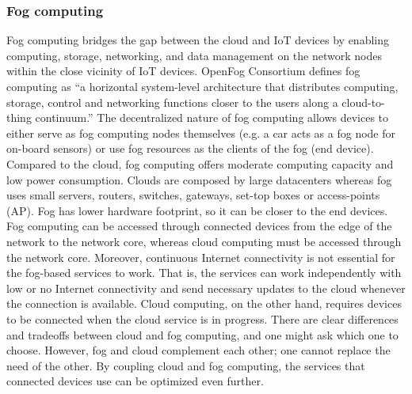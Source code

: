 \subsubsection{Fog computing}
Fog computing bridges the gap between the cloud and IoT devices by enabling computing, storage, networking, and data management on the network nodes within the close vicinity of IoT devices. OpenFog Consortium \cite{WhatIsFo95:online} defines fog computing as ``a horizontal system-level architecture that distributes computing, storage, control and networking functions closer to the users along a cloud-to-thing continuum.'' The decentralized nature of fog computing allows devices to either serve as fog computing nodes themselves (e.g. a car acts as a fog node for on-board sensors) or use fog resources as the clients of the fog (end device). Compared to the cloud, fog computing offers moderate computing capacity and low power consumption. Clouds are composed by large datacenters whereas fog uses small servers, routers, switches, gateways, set-top boxes or access-points (AP). Fog has lower hardware footprint, so it can be closer to the end devices. Fog computing can be accessed through connected devices from the edge of the network to the network core, whereas cloud computing must be accessed through the network core. Moreover, continuous Internet connectivity is not essential for the fog-based services to work. That is, the services can work independently with low or no Internet connectivity and send necessary updates to the cloud whenever the connection is available. Cloud computing, on the other hand, requires devices to be connected when the cloud service is in progress. There are clear differences and tradeoffs between cloud and fog computing, and one might ask which one to choose. However, fog and cloud complement each other; one cannot replace the need of the other. By coupling cloud and fog computing, the services that connected devices use can be optimized even further.

